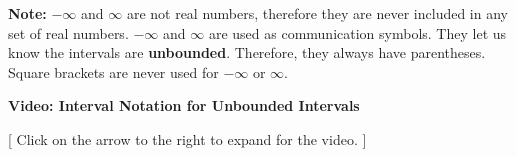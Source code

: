 \documentclass{ximera}
\begin{document}
\begin{itemize}
\begin{itemize}
\begin{image}
	\end{image}

	\end{itemize}

\end{itemize}



\textbf{Note:} $-\infty$ and $\infty$ are not real numbers, therefore they are never included in any set of real numbers.  $-\infty$ and $\infty$ are used as communication symbols. They let us know the intervals are \textbf{unbounded}. Therefore, they always have parentheses.  Square brackets are never used for $-\infty$ or $\infty$.











\begin{onlineOnly}
\begin{explanation} \textbf{\textcolor{red!75!green}{Video: Interval Notation for Unbounded Intervals}} 

[ Click on the arrow to the right to expand for the video. ]
\begin{expandable} 

\begin{center}
\end{center}

\end{expandable}

\end{explanation}
\end{onlineOnly}
\end{document}
